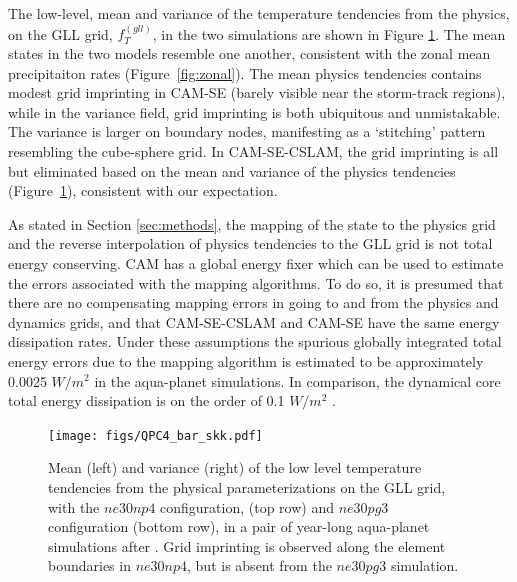 \documentclass[twocol]{ametsoc}
\begin{document}
The low-level, mean and variance of the temperature tendencies from the physics, on the GLL grid, $f_T^{(gll)}$, in the two simulations are shown in Figure \ref{fig:tendency_imprint}. {\color{red}The mean states in the two models resemble one another, consistent with the zonal mean precipitaiton rates (Figure~\ref{fig:zonal}).{}} The mean physics tendencies contains modest grid imprinting in CAM-SE (barely visible near the storm-track regions), while in the variance field, grid imprinting is both ubiquitous and unmistakable. The variance is larger on boundary nodes, manifesting as a `stitching' pattern resembling the cube-sphere grid. In CAM-SE-CSLAM, the grid imprinting is all but eliminated based on the mean and variance of the physics tendencies (Figure~\ref{fig:tendency_imprint}), consistent with our expectation.

As stated in Section \ref{sec:methods}, the mapping of the state to the physics grid and the reverse interpolation of physics tendencies to the GLL grid is not total energy conserving. CAM has a global energy fixer \citep{WOHTTV2015JAMES} which can be used to estimate the errors associated with the mapping algorithms. To do so, it is presumed that there are no compensating mapping errors in going to and from the physics and dynamics grids, and that CAM-SE-CSLAM and CAM-SE have the same energy dissipation rates. Under these assumptions the spurious globally integrated total energy errors due to the mapping algorithm is estimated to be approximately 0.0025 $W/m^2$ in the aqua-planet simulations. In comparison, the dynamical core total energy dissipation is on the order of 0.1 $W/m^2$ \citep{LetAl2018JAMES}. 

\begin{figure}[t]
\noindent\texttt{[image: figs/QPC4\_bar\_skk.pdf]}\\
\caption{Mean (left) and variance (right) of the low level temperature tendencies from the physical parameterizations on the GLL grid, with the $ne30np4$ configuration, (top row) and $ne30pg3$ configuration (bottom row), in a pair of year-long aqua-planet simulations after \cite{MWO2016JAMES}. Grid imprinting is observed along the element boundaries in $ne30np4$, but is absent from the $ne30pg3$ simulation.}
\label{fig:tendency_imprint}
\end{figure}
\end{document}
